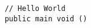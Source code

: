 \documentclass[11pt]{article}
\title{}
\begin{document}
\maketitle

\begin{lstlisting}
	// Hello World
	public main void ()
\end{lstlisting}
\end{document}

